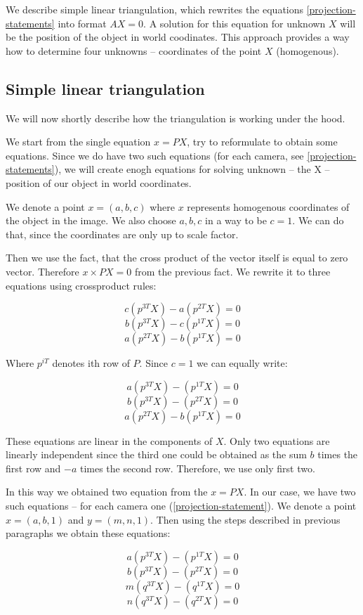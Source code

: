 We describe simple linear triangulation, which rewrites the equations
\ref{projection-statements} into format $AX = 0$. A solution for this equation
for unknown $X$ will be the position of the object in world coodinates. This
approach provides a way how to determine four unknowns -- coordinates
of the point $X$ (homogenous).


\subsection{Simple linear triangulation}

We will now shortly describe how the triangulation is working under the hood.

We start from the single equation $x = PX$, try to reformulate to obtain some
equations. Since we do have two such equations (for each camera, see
\ref{projection-statements}), we will create enogh equations for solving
unknown -- the X -- position of our object in world coordinates.

We denote a point $x=(a, b, c)$ where $x$ represents homogenous coordinates of
the object in the image. We also choose $a, b, c$ in a way to be $c = 1$. We
can do that, since the coordinates are only up to scale factor.

Then we use the fact, that the cross product of the vector itself is equal to
zero vector. Therefore $x \times PX = 0$ from the previous fact. We rewrite it
to three equations using crossproduct rules:

$$ c(p^{3T}X) - a(p^{2T}X) = 0 $$
$$ b(p^{3T}X) - c(p^{1T}X) = 0 $$
$$ a(p^{2T}X) - b(p^{1T}X) = 0 $$

Where $p^{iT}$ denotes ith row of $P$. Since $c = 1$ we can equally write:

$$ a(p^{3T}X) - (p^{1T}X) = 0 $$
$$ b(p^{3T}X) - (p^{2T}X) = 0 $$
$$ a(p^{2T}X) - b(p^{1T}X) = 0 $$

These equations are linear in the components of $X$. Only two equations are
linearly independent since the third one could be obtained as the sum $b$
times the first row and $-a$ times the second row. Therefore, we use only first
two.

In this way we obtained two equation from the $x = PX$. In our case, we have
two such equations -- for each camera one (\ref{projection-statement}). We
denote a point $x = (a, b, 1)$ and $y=(m, n, 1)$. Then using the steps described in previous paragraphs we obtain these equations:

$$ a(p^{3T}X) - (p^{1T}X) = 0 $$
$$ b(p^{3T}X) - (p^{2T}X) = 0 $$
$$ m(q^{3T}X) - (q^{1T}X) = 0 $$
$$ n(q^{3T}X) - (q^{2T}X) = 0 $$

